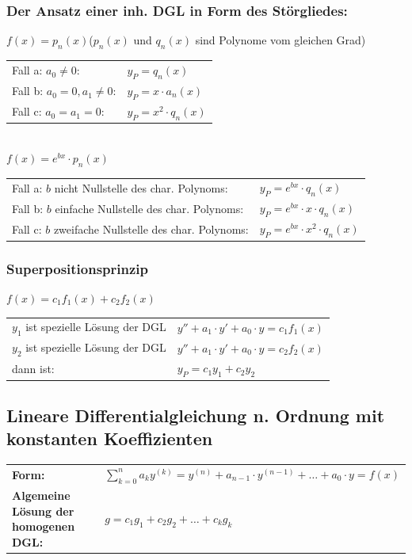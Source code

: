 \subsubsection{Der Ansatz einer inh. DGL in Form des Störgliedes:\quad{}}
$f(x)=p_n(x)$\hspace{9cm}($p_n(x)$ und $q_n(x)$ sind Polynome vom gleichen Grad)\\
\begin{tabular}{p{8cm}p{4cm}}
Fall a: $a_0\neq 0$:          & $y_P = q_n(x)$\\
Fall b: $a_0 = 0 , a_1\neq 0$:& $y_P=x\cdot a_n(x)$\\
Fall c: $a_0=a_1=0$:          & $y_P=x^2\cdot q_n(x)$\\
\end{tabular}\\
$f(x)=e^{bx}\cdot p_n(x)$\\
\begin{tabular}{p{8cm}p{4cm}}
Fall a: $b$ nicht Nullstelle des char. Polynoms:    &
$y_P=e^{bx}\cdot q_n(x)$\\
Fall b: $b$ einfache Nullstelle des char. Polynoms: &
$y_P=e^{bx}\cdot x \cdot q_n(x)$\\
Fall c: $b$ zweifache Nullstelle des char. Polynoms:&
$y_P=e^{bx}\cdot x^2\cdot q_n(x)$\\
\end{tabular}



\subsubsection{Superpositionsprinzip}
$f(x)=c_1f_1(x)+c_2f_2(x)$\\
\begin{tabular}{p{8cm}p{4cm}}
$y_1$ ist spezielle Lösung der DGL &
$y''+a_1\cdot y'+a_0\cdot y=c_1f_1(x)$ \\
$y_2$ ist spezielle Lösung der DGL &
$y''+a_1\cdot y'+a_0\cdot y=c_2f_2(x)$ \\
dann ist:                          &
$y_P=c_1y_1+c_2y_2$\\
\end{tabular}

\subsection{Lineare Differentialgleichung n. Ordnung mit konstanten 
Koeffizienten }
\begin{tabular}{p{8cm}p{8cm}}
\textbf{Form:} &
$\sum\limits_{k=0}^na_ky^{(k)}= y^{(n)}+a_{n-1}\cdot y^{(n-1)}+\ldots +a_0\cdot y=f(x)$\\
\textbf{Algemeine Lösung der homogenen DGL:} &
$g=c_1g_1+c_2g_2+\ldots +c_kg_k$\\
\end{tabular}

